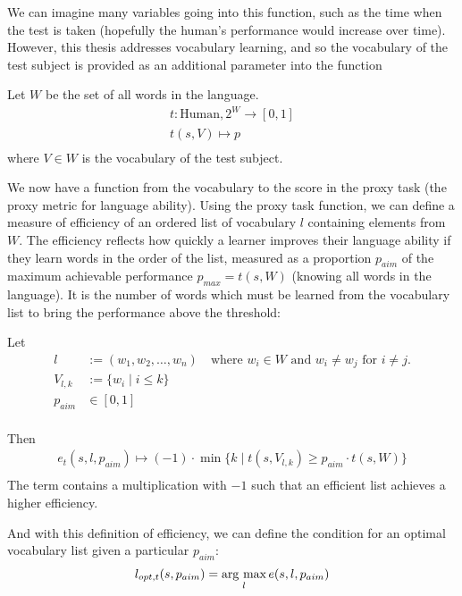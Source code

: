 We can imagine many variables going into this function, such as the time when the test is taken (hopefully the human's performance would increase over time). However, this thesis addresses vocabulary learning, and so the vocabulary of the test subject is provided as an additional parameter into the function

Let $W$ be the set of all words in the language.
\begin{align*}
	t: \text{Human}, 2^{W}\to [0, 1] \\
	t (s, V) \mapsto p                   \\
\end{align*}
where $V \in W$ is the vocabulary of the test subject.

We now have a function from the vocabulary to the score in the proxy task (the proxy metric for language ability).
Using the proxy task function, we can define a measure of efficiency of an ordered list of vocabulary $l$ containing elements from $W$.
The efficiency reflects how quickly a learner improves their language ability if they learn words in the order of the list, measured as a proportion $p_{aim}$ of the maximum achievable performance $p_{max} = t(s,W)$ (knowing all words in the language).
It is the number of words which must be learned from the vocabulary list to bring the performance above the threshold:

Let
\begin{align*}
	l        & := (w_1, w_2, \dots, w_n) \quad \text{where } w_i \in W \text{ and } w_i \neq w_j \text{ for } i \neq j. \\
	V_{l, k} & := \{w_i \mid i \leq k\}                                                                                 \\
	p_{aim}  & \in  [0, 1]                                                                                              \\
\end{align*}

Then
\begin{align*}
	e_{t}(s, l, p_{aim}) \mapsto ( -1 )  \cdot  \min\{ k \mid  t(s,  V_{l, k}) \geq p_{aim} \cdot t(s, W)\} \\
\end{align*}
The term contains a multiplication with $-1$ such that an efficient list achieves a higher efficiency.

And with this definition of efficiency, we can define the condition for an optimal vocabulary list given a particular $p_{aim}$:
\begin{align} \label{eq:opt-vocab-list}
	l_{opt, t} (s, p_{aim}) = \mathop{\rm arg~max}\limits_{l} e(s, l, p_{aim})
\end{align}


